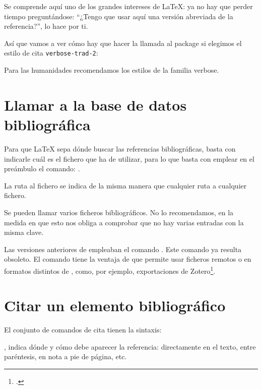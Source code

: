 Se comprende aquí uno de los grandes intereses de \LaTeX{}: ya no hay
que perder tiempo preguntándose: \enquote{¿Tengo que usar aquí una
  versión abreviada de la referencia?},  lo hace por
ti.

Así que vamos a ver cómo hay que hacer la llamada al package si
elegimos el estilo de cita \verb|verbose-trad-2|:

\begin{latexcode}
\usepackage[citestyle=verbose-trad2]{biblatex}
\end{latexcode}

Para las humanidades recomendamos los estilos de la familia verbose.


\section{Llamar a la base de datos bibliográfica}


Para que \LaTeX{} sepa dónde buscar las referencias bibliográficas,
basta con indicarle cuál es el fichero  que ha de utilizar,
para lo que basta con emplear en el preámbulo el comando:
.

La ruta al fichero se indica de la misma manera que cualquier ruta a
cualquier fichero.

\begin{attention}
Se pueden llamar varios ficheros bibliográficos. No lo recomendamos,
en la medida en que esto nos obliga a comprobar que no hay varias
entradas con la misma clave.
\end{attention}

\begin{plusloins}
Las versiones anteriores de  empleaban el comando
. Este comando ya resulta obsoleto. El comando
 tiene la ventaja de que permite usar ficheros
remotos o en formatos distintos de , como, por ejemplo,
exportaciones de Zotero\footcite{biblatex_resources}. 
\end{plusloins}

\section{Citar un elemento bibliográfico}

El conjunto de comandos de cita tienen la sintaxis: 

,
 indica dónde y cómo debe aparecer la referencia:
directamente en el texto, entre paréntesis, en nota a pie de página, etc.

